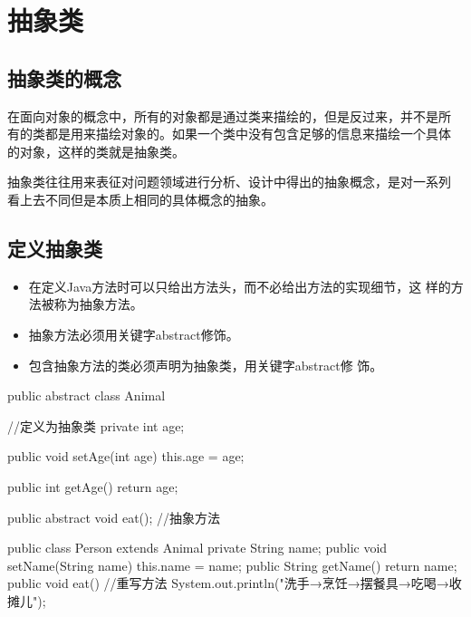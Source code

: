 
\section{抽象类}

\subsection{抽象类的概念}

在面向对象的概念中，所有的对象都是通过类来描绘的，但是反过来，并不是所
有的类都是用来描绘对象的。如果一个类中没有包含足够的信息来描绘一个具体
的对象，这样的类就是抽象类。

抽象类往往用来表征对问题领域进行分析、设计中得出的抽象概念，是对一系列
看上去不同但是本质上相同的具体概念的抽象。

\subsection{定义抽象类}

\begin{itemize}
\item 在定义Java方法时可以只给出方法头，而不必给出方法的实现细节，这
  样的方法被称为{\Red 抽象方法}。
\item 抽象方法必须用关键字{\Red abstract}修饰。
\item 包含抽象方法的类必须声明为抽象类，用关键字{\Red abstract}修
  饰。
\end{itemize}

  
\begin{javaCode}
  public abstract class Animal { //定义为抽象类
    private int age;
    
    public void setAge(int age) {
      this.age = age;
    }
    
    public int getAge(){
      return age;
    }
    
    public abstract void eat(); //抽象方法
  }
\end{javaCode}



\begin{javaCode}
  public class Person extends Animal {
    private String name;
    public void setName(String name) {
      this.name = name;
    }
    public String getName() {
      return name;
    }
    public void eat() { //重写方法
      System.out.println("洗手→烹饪→摆餐具→吃喝→收摊儿");
    }
  }
\end{javaCode}

